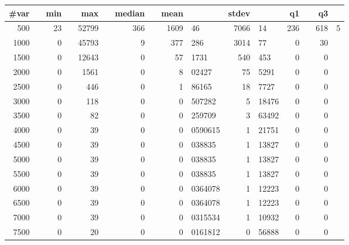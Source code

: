\begin{tabular}{r@{.}lr@{.}lr@{.}lr@{.}lr@{.}lr@{.}lr@{.}lr@{.}l}
\toprule
\textbf{\#var}&	&\textbf{min}&	&\textbf{max}&	&\textbf{median}&	&\textbf{mean}&	&\textbf{stdev}&	&\textbf{q1}&	&\textbf{q3}&\\\midrule
500&	&23&	&52799&	&366&	&1609&46	&7066&14	&236&	&618&5\\
1000&	&0&	&45793&	&9&	&377&286	&3014&77	&0&	&30&\\
1500&	&0&	&12643&	&0&	&57&1731	&540&453	&0&	&0&\\
2000&	&0&	&1561&	&0&	&8&02427	&75&5291	&0&	&0&\\
2500&	&0&	&446&	&0&	&1&86165	&18&7727	&0&	&0&\\
3000&	&0&	&118&	&0&	&0&507282	&5&18476	&0&	&0&\\
3500&	&0&	&82&	&0&	&0&259709	&3&63492	&0&	&0&\\
4000&	&0&	&39&	&0&	&0&0590615	&1&21751	&0&	&0&\\
4500&	&0&	&39&	&0&	&0&038835	&1&13827	&0&	&0&\\
5000&	&0&	&39&	&0&	&0&038835	&1&13827	&0&	&0&\\
5500&	&0&	&39&	&0&	&0&038835	&1&13827	&0&	&0&\\
6000&	&0&	&39&	&0&	&0&0364078	&1&12223	&0&	&0&\\
6500&	&0&	&39&	&0&	&0&0364078	&1&12223	&0&	&0&\\
7000&	&0&	&39&	&0&	&0&0315534	&1&10932	&0&	&0&\\
7500&	&0&	&20&	&0&	&0&0161812	&0&56888	&0&	&0&\\
\bottomrule
\end{tabular}